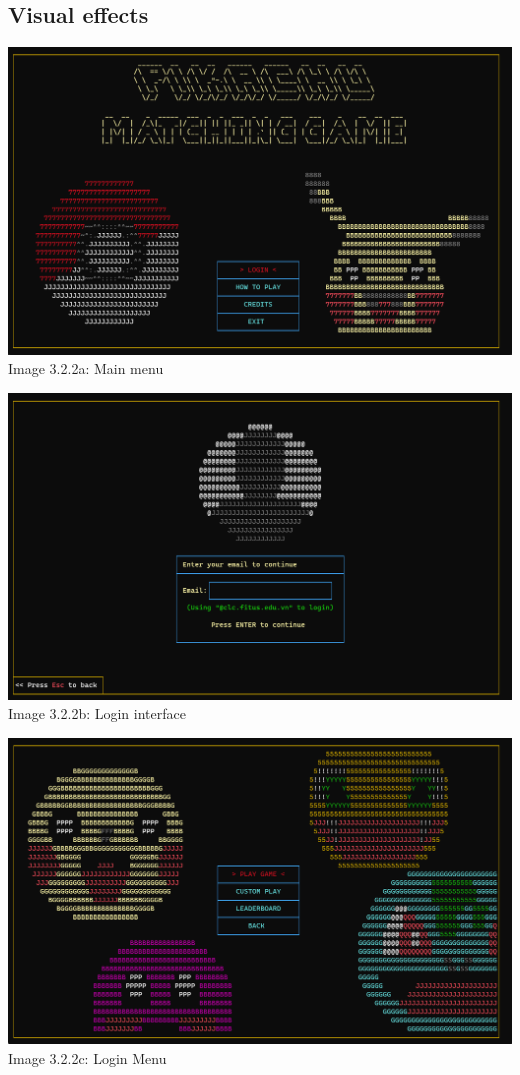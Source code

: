 \documentclass[12pt,a4paper]{report}
\begin{document}
\subsection{Visual effects}
\begin{center}
    \includegraphics[scale=0.3]{Main Menu.png}\\[0.2cm]
    Image 3.2.2a: Main menu
\end{center}
\begin{center}
    \includegraphics[scale=0.3]{Login Interface.png}\\[0.2cm]
    Image 3.2.2b: Login interface
\end{center}
\begin{center}
    \includegraphics[scale=0.3]{Login Menu.png}\\[0.2cm]
    Image 3.2.2c: Login Menu
\end{center}
\end{document}
